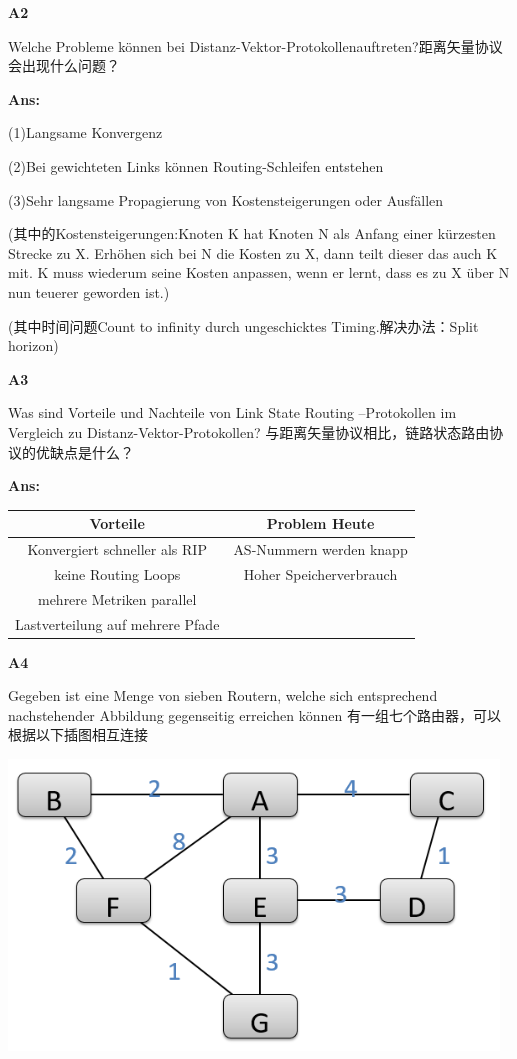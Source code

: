 \documentclass[fleqn]{article}
\begin{document}
\noindent\textbf{A2}

Welche Probleme können  bei Distanz-Vektor-Protokollenauftreten?距离矢量协议会出现什么问题？

\textbf{Ans:}

(1)Langsame Konvergenz

(2)Bei gewichteten Links können Routing-Schleifen entstehen

(3)Sehr langsame Propagierung von Kostensteigerungen oder Ausfällen

\indent\indent(其中的Kostensteigerungen:Knoten K hat Knoten N als Anfang einer kürzesten Strecke zu X. Erhöhen sich bei N die Kosten zu X, dann teilt dieser das auch K mit. K muss wiederum seine Kosten anpassen, wenn er lernt, dass es zu X über N nun teuerer geworden ist.)

\indent\indent(其中时间问题Count to infinity durch ungeschicktes Timing.解决办法：Split horizon)

\noindent\textbf{A3}

Was sind Vorteile und Nachteile von Link State Routing –Protokollen im Vergleich zu Distanz-Vektor-Protokollen?
与距离矢量协议相比，链路状态路由协议的优缺点是什么？

\textbf{Ans:}

\begin{center}
    \begin{tabular}{c|c}
        Vorteile&Problem Heute\\
        \hline
        Konvergiert schneller als RIP&AS-Nummern werden knapp\\
        keine Routing Loops&Hoher Speicherverbrauch\\
        mehrere Metriken parallel\\
        Lastverteilung auf mehrere Pfade
    \end{tabular}
\end{center}


\noindent\textbf{A4}

Gegeben ist eine Menge von sieben Routern, welche sich entsprechend nachstehender Abbildung gegenseitig erreichen können
有一组七个路由器，可以根据以下插图相互连接

\begin{center}
    \includegraphics[scale=0.5]{bild10.png}
\end{center}
\end{document}
